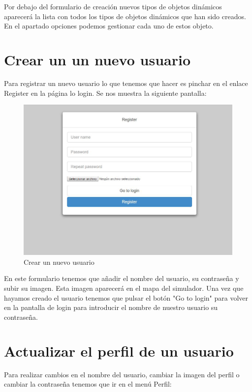 Por debajo del formulario de creación nuevos tipos de objetos dinámicos aparecerá la lista con todos los tipos de objetos dinámicos que han sido creados. En el apartado opciones podemos gestionar cada uno de estos objeto.

\section{Crear un un nuevo usuario}\label{sec:CrearUsuario}

Para registrar un nuevo usuario lo que tenemos que hacer es pinchar en el enlace Register en la página lo login. Se nos muestra la siguiente pantalla:

\begin{figure}[H]
	\centering\includegraphics[scale=0.25]{imagenes/capitulo5/register.jpg}
	\caption{Crear un nuevo usuario}
	\label{img:AddUser}
\end{figure}

En este formulario tenemos que añadir el nombre del usuario, su contraseña y subir su imagen. Esta imagen aparecerá en el mapa del simulador. Una vez que hayamos creado el usuario tenemos que pulsar el botón "Go to login" para volver en la pantalla de login para introducir el nombre de nuestro usuario su contraseña.

\section{Actualizar el perfil de un usuario}

Para realizar cambios en el nombre del usuario, cambiar la imagen del perfil o cambiar la contraseña tenemos que ir en el menú Perfil:

